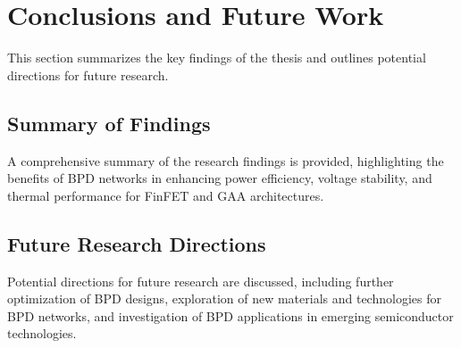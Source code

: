\section{Conclusions and Future Work}
This section summarizes the key findings of the thesis and outlines potential directions for future research.

\subsection{Summary of Findings}
A comprehensive summary of the research findings is provided, highlighting the benefits of BPD networks in enhancing power efficiency, voltage stability, and thermal performance for FinFET and GAA architectures.

\subsection{Future Research Directions}
Potential directions for future research are discussed, including further optimization of BPD designs, exploration of new materials and technologies for BPD networks, and investigation of BPD applications in emerging semiconductor technologies.
